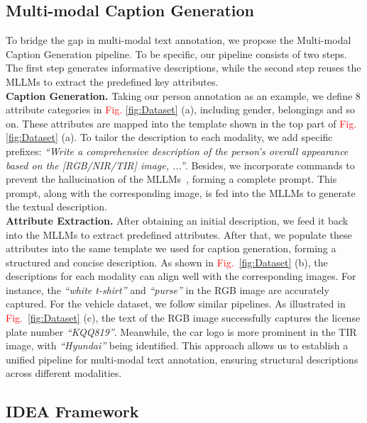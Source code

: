 \subsection{Multi-modal Caption Generation}
To bridge the gap in multi-modal text annotation, we propose the Multi-modal Caption Generation pipeline.
%
To be specific, our pipeline consists of two steps.
%
The first step generates informative descriptions, while the second step reuses the MLLMs to extract the predefined key attributes.
%
\\
\textbf{Caption Generation.}
%
Taking our person annotation as an example, we define 8 attribute categories in \textcolor{red}{Fig.} \ref{fig:Dataset} (a), including gender, belongings and so on.
%
These attributes are mapped into the template shown in the top part of \textcolor{red}{Fig.} \ref{fig:Dataset} (a).
%
To tailor the description to each modality, we add specific prefixes: \textit{“Write a comprehensive description of the person's overall appearance based on the [RGB/NIR/TIR] image, ...”}.
%
Besides, we incorporate commands to prevent the hallucination of the MLLMs~\cite{tan2024harnessing}, forming a complete prompt.
%
This prompt, along with the corresponding image, is fed into the MLLMs to generate the textual description.
%
\\
\textbf{Attribute Extraction.}
After obtaining an initial description, we feed it back into the MLLMs to extract predefined attributes.
%
After that, we populate these attributes into the same template we used for caption generation, forming a structured and concise description.
%
As shown in \textcolor{red}{Fig.}~\ref{fig:Dataset} (b), the descriptions for each modality can align well with the corresponding images.
%
For instance, the \textit{“white t-shirt”} and \textit{“purse”} in the RGB image are accurately captured.
%
For the vehicle dataset, we follow similar pipelines.
%
As illustrated in \textcolor{red}{Fig.}~\ref{fig:Dataset} (c), the text of the RGB image successfully captures the license plate number \textit{“KQQ819”}.
%
Meanwhile, the car logo is more prominent in the TIR image, with \textit{“Hyundai”} being identified.
%
This approach allows us to establish a unified pipeline for multi-modal text annotation, ensuring structural descriptions across different modalities.
\subsection{IDEA Framework}
